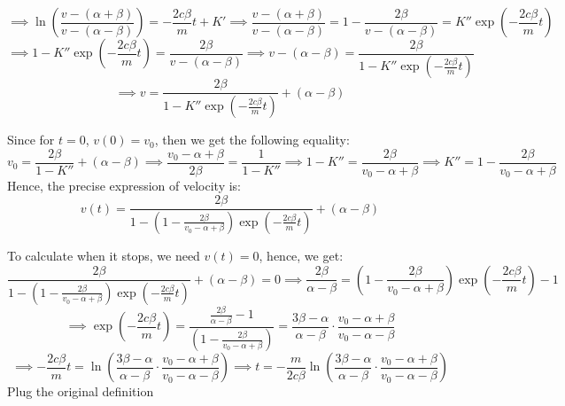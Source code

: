 \documentclass{article}
\begin{document}
$$\implies \ln\left(\frac{v-(\alpha+\beta)}{v-(\alpha-\beta)}\right) = -\frac{2c\beta}{m}t+K'\implies \frac{v-(\alpha+\beta)}{v-(\alpha-\beta)} = 1-\frac{2\beta}{v-(\alpha-\beta)} = K''\exp\left(-\frac{2c\beta}{m}t\right)$$
$$\implies 1-K''\exp\left(-\frac{2c\beta}{m}t\right) = \frac{2\beta}{v-(\alpha-\beta)}\implies v-(\alpha-\beta)= \frac{2\beta}{1-K''\exp\left(-\frac{2c\beta}{m}t\right)}$$
$$\implies v= \frac{2\beta}{1-K''\exp\left(-\frac{2c\beta}{m}t\right)}+(\alpha-\beta)$$

Since for $t=0$, $v(0)=v_0$, then we get the following equality:
$$v_0 = \frac{2\beta}{1-K''}+(\alpha-\beta) \implies \frac{v_0-\alpha+\beta}{2\beta} = \frac{1}{1-K''}\implies 1-K'' = \frac{2\beta}{v_0-\alpha+\beta}\implies K'' = 1-\frac{2\beta}{v_0-\alpha+\beta}$$
Hence, the precise expression of velocity is:
$$v(t) = \frac{2\beta}{1-\left(1-\frac{2\beta}{v_0-\alpha+\beta}\right)\exp\left(-\frac{2c\beta}{m}t\right)}+(\alpha-\beta)$$

\hfil

To calculate when it stops, we need $v(t)=0$, hence, we get:
$$\frac{2\beta}{1-\left(1-\frac{2\beta}{v_0-\alpha+\beta}\right)\exp\left(-\frac{2c\beta}{m}t\right)}+(\alpha-\beta) = 0\implies \frac{2\beta}{\alpha-\beta}=\left(1-\frac{2\beta}{v_0-\alpha+\beta}\right)\exp\left(-\frac{2c\beta}{m}t\right)-1$$
$$\implies \exp\left(-\frac{2c\beta}{m}t\right) = \frac{\frac{2\beta}{\alpha-\beta}-1}{(1-\frac{2\beta}{v_0-\alpha+\beta})} = \frac{3\beta-\alpha}{\alpha-\beta}\cdot \frac{v_0-\alpha+\beta}{v_0-\alpha-\beta}$$
$$\implies -\frac{2c\beta}{m}t = \ln\left(\frac{3\beta-\alpha}{\alpha-\beta}\cdot \frac{v_0-\alpha+\beta}{v_0-\alpha-\beta}\right)\implies t=-\frac{m}{2c\beta}\ln\left(\frac{3\beta-\alpha}{\alpha-\beta}\cdot \frac{v_0-\alpha+\beta}{v_0-\alpha-\beta}\right)$$
Plug the original definition
\end{document}
